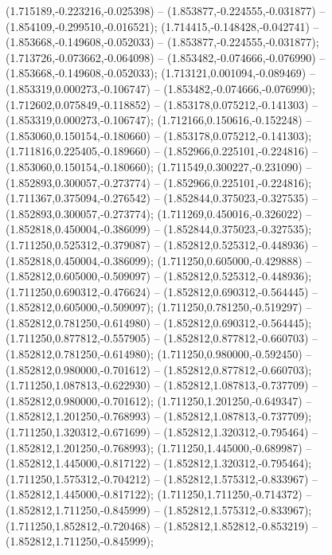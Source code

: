  (1.715189,-0.223216,-0.025398) -- (1.853877,-0.224555,-0.031877) -- (1.854109,-0.299510,-0.016521);
 (1.714415,-0.148428,-0.042741) -- (1.853668,-0.149608,-0.052033) -- (1.853877,-0.224555,-0.031877);
 (1.713726,-0.073662,-0.064098) -- (1.853482,-0.074666,-0.076990) -- (1.853668,-0.149608,-0.052033);
 (1.713121,0.001094,-0.089469) -- (1.853319,0.000273,-0.106747) -- (1.853482,-0.074666,-0.076990);
 (1.712602,0.075849,-0.118852) -- (1.853178,0.075212,-0.141303) -- (1.853319,0.000273,-0.106747);
 (1.712166,0.150616,-0.152248) -- (1.853060,0.150154,-0.180660) -- (1.853178,0.075212,-0.141303);
 (1.711816,0.225405,-0.189660) -- (1.852966,0.225101,-0.224816) -- (1.853060,0.150154,-0.180660);
 (1.711549,0.300227,-0.231090) -- (1.852893,0.300057,-0.273774) -- (1.852966,0.225101,-0.224816);
 (1.711367,0.375094,-0.276542) -- (1.852844,0.375023,-0.327535) -- (1.852893,0.300057,-0.273774);
 (1.711269,0.450016,-0.326022) -- (1.852818,0.450004,-0.386099) -- (1.852844,0.375023,-0.327535);
 (1.711250,0.525312,-0.379087) -- (1.852812,0.525312,-0.448936) -- (1.852818,0.450004,-0.386099);
 (1.711250,0.605000,-0.429888) -- (1.852812,0.605000,-0.509097) -- (1.852812,0.525312,-0.448936);
 (1.711250,0.690312,-0.476624) -- (1.852812,0.690312,-0.564445) -- (1.852812,0.605000,-0.509097);
 (1.711250,0.781250,-0.519297) -- (1.852812,0.781250,-0.614980) -- (1.852812,0.690312,-0.564445);
 (1.711250,0.877812,-0.557905) -- (1.852812,0.877812,-0.660703) -- (1.852812,0.781250,-0.614980);
 (1.711250,0.980000,-0.592450) -- (1.852812,0.980000,-0.701612) -- (1.852812,0.877812,-0.660703);
 (1.711250,1.087813,-0.622930) -- (1.852812,1.087813,-0.737709) -- (1.852812,0.980000,-0.701612);
 (1.711250,1.201250,-0.649347) -- (1.852812,1.201250,-0.768993) -- (1.852812,1.087813,-0.737709);
 (1.711250,1.320312,-0.671699) -- (1.852812,1.320312,-0.795464) -- (1.852812,1.201250,-0.768993);
 (1.711250,1.445000,-0.689987) -- (1.852812,1.445000,-0.817122) -- (1.852812,1.320312,-0.795464);
 (1.711250,1.575312,-0.704212) -- (1.852812,1.575312,-0.833967) -- (1.852812,1.445000,-0.817122);
 (1.711250,1.711250,-0.714372) -- (1.852812,1.711250,-0.845999) -- (1.852812,1.575312,-0.833967);
 (1.711250,1.852812,-0.720468) -- (1.852812,1.852812,-0.853219) -- (1.852812,1.711250,-0.845999);

